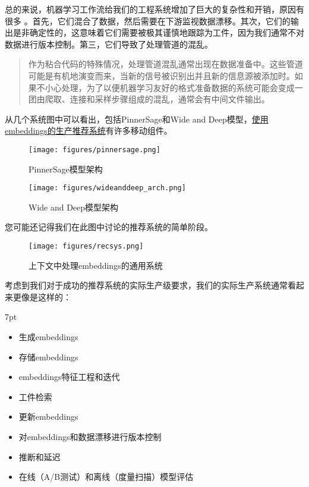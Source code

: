 \documentclass[Chinese, 11pt, table]{diazessay} %
\newenvironment{formal}{%
  \def\FrameCommand{%
	\hspace{1pt}%
	{\color{w_lightblue}\vrule width 2pt}%
	{\color{formalshade}\vrule width 4pt}%
	\colorbox{formalshade}%
  }%
  \MakeFramed{\advance\hsize-\width\FrameRestore}%
  \noindent\hspace{-4.55pt}%
  \begin{adjustwidth}{}{7pt}%
  \vspace{2pt}\vspace{2pt}%
}
{%
  \vspace{2pt}\end{adjustwidth}\endMakeFramed%
}
\begin{document}
\begin{CJK}{UTF8}{gbsn}
\begin{sloppypar}
总的来说，机器学习工作流给我们的工程系统增加了巨大的复杂性和开销，原因有很多 \citep{sculley2014machine}。首先，它们混合了数据，然后需要在下游监视数据漂移。其次，它们的输出是非确定性的，这意味着它们需要被极其谨慎地跟踪为工件，因为我们通常不对数据进行版本控制。第三，它们导致了处理管道的混乱。

\begin{quote}
作为粘合代码的特殊情况，处理管道混乱通常出现在数据准备中。这些管道可能是有机地演变而来，当新的信号被识别出并且新的信息源被添加时。如果不小心处理，为了以便机器学习友好的格式准备数据的系统可能会变成一团由爬取、连接和采样步骤组成的混乱，通常会有中间文件输出。
\end{quote}

从几个系统图中可以看出，包括PinnerSage和Wide and Deep模型，\href{https://amatriain.net/blog/RecsysArchitectures}{使用embeddings的生产推荐系统}有许多移动组件。

\begin{figure}[H]
  \centering
  \begin{minipage}[b]{0.4\textwidth}
	\texttt{[image: figures/pinnersage.png]}
	\caption{PinnerSage模型架构 \citep{pal2020pinnersage}}
  \end{minipage}
  \hfill
  \begin{minipage}[b]{0.4\textwidth}
	\texttt{[image: figures/wideanddeep\_arch.png]}
	\caption{Wide and Deep模型架构 \citep{cheng2016wide}}
  \end{minipage}
\end{figure}

您可能还记得我们在此图中讨论的推荐系统的简单阶段。

\begin{figure}[H]
\centering
\texttt{[image: figures/recsys.png]}
\caption{上下文中处理embeddings的通用系统}
\end{figure}

考虑到我们对于成功的推荐系统的实际生产级要求，我们的实际生产系统通常看起来更像是这样的：

\begin{formal}
\begin{itemize}
  \item 生成embeddings
  \item 存储embeddings
  \item embeddings特征工程和迭代
  \item 工件检索
  \item 更新embeddings
  \item 对embeddings和数据漂移进行版本控制
  \item 推断和延迟
  \item 在线（A/B测试）和离线（度量扫描）模型评估
\end{itemize}
\end{formal}


\end{sloppypar}
\end{CJK}
\end{document}
